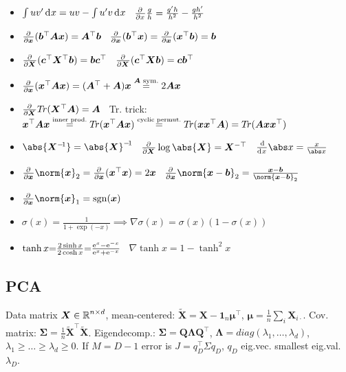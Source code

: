 \begin{itemize}
    \item $\int u v' \diff x = u v - \int u' v \diff x$
        \quad\textbullet\,
        $\pderiv{}{x} \frac{g}{h} = \frac{g'h}{h^2} - \frac{gh'}{h^2}$
    \item $\pderiv{}{\bm x} (\bm b^\top \bm{Ax}) = \bm A^\top \bm b$
        \quad\textbullet\,
        $\pderiv{}{\bm x} (\bm b^\top\bm  x) = \pderiv{}{\bm x} (\bm x^\top\bm  b) = \bm b$
    \item $\pderiv{}{\bm X} (\bm c^\top \bm X^\top \bm b) = \bm{bc}^\top$
        \quad\textbullet\,
        $\pderiv{}{\bm X} (\bm c^\top \bm{Xb}) = \bm{cb}^\top$
    \item $\pderiv{}{\bm x} (\bm x^\top \bm{Ax}) = (\bm A^\top + \bm A)\bm x \overset{\bm A\textrm{ sym.}}{=} 2\bm{Ax}$
    \item $\pderiv{}{\bm X} T\!r(\bm X^\top \bm A) = \bm A$
        \quad\textbullet\,
        Tr. trick: $\bm x^\top \bm{Ax} \overset{\small\substack{\textrm{inner prod.}}}{=} T\!r (\bm x^\top \bm{Ax}) \overset{\small\substack{\textrm{cyclic permut.}}}{=} T\!r(\bm{xx}^\top \bm A) = T\!r(\bm{Axx}^\top)$
    \item $\abs{\bm X^{-\!1}} = \abs{\bm X}^{-\!1}$
        \hfill\textbullet\,
        $\pderiv{}{\bm X} \log \abs{\bm X} = \bm X^{-\top}$
        \hfill\textbullet\,
        $\deriv{}{x} \abs x = \frac{x}{\abs x}$
    \item $\pderiv{}{\bm x} \norm{\bm x}_2 = \pderiv{}{\bm x} (\bm x^\top \bm x) = 2\bm x$
        \quad\textbullet\,
        $\pderiv{}{\bm x} \norm{\bm x - \bm b}_2 = \frac{\bm x-\bm b}{\norm{\bm x-\bm b}_2}$
    \item $\pderiv{}{\bm x} \norm{\bm x}_1 = \mathrm{sgn}(\bm x)$
    \item $\sigma(x) = \frac{1}{1 + \exp(-x)} \implies \nabla\sigma(x) = \sigma(x)(1-\sigma(x))$
    \item $\tanh x {=} \frac{2\sinh x}{2\cosh x} {=} \frac{\mathrm{e}^x - \mathrm{e}^{-x}}{\mathrm{e}^x+\mathrm{e}^{-x}}$
        \;\textbullet\,
        $\nabla\!\tanh x {=} 1\!-\tanh^2\! x$
\end{itemize}

\subsection{PCA}
Data matrix $\bm X \in \operatorname{\mathbb{R}}^{n \times d}$, mean-centered: $\bm{\tilde X} = \bm X - \bm 1_n \bm\mu^\top$, $\bm\mu = \frac1n \sum_i \bm X_{i\cdot}$.
Cov. matrix: $\bm\Sigma = \frac1n \bm{\tilde X}^\top \bm{\tilde X}$. Eigendecomp.: $\bm\Sigma = \bm Q \bm\Lambda \bm Q^\top$, $\bm\Lambda = diag(\lambda_1, \ldots, \lambda_d)$, $\lambda_1 \geq \ldots \geq \lambda_d \geq 0$.
If $M = D-1$ error is $J=q_D^\top \Sigma q_D$, $q_D$ eig.vec. smallest eig.val. $\lambda_D$.

